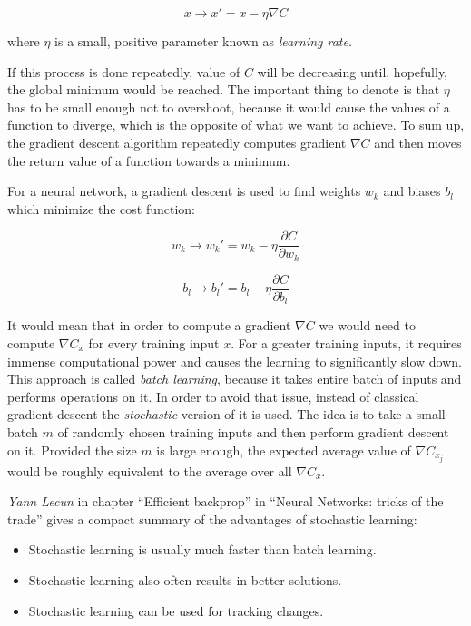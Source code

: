 \begin{equation}
x \longrightarrow x' = x - \eta \nabla C
\end{equation}

where $\eta$ is a small, positive parameter known as \emph{learning rate}.

If this process is done repeatedly, value of $C$ will be decreasing until, hopefully, the global minimum would be reached. The important thing to denote is that $\eta$ has to be small enough not to overshoot, because it would cause the values of a function to diverge, which is the opposite of what we want to achieve. To sum up, the gradient descent algorithm repeatedly computes gradient $\nabla C$ and then moves the return value of a function towards a minimum.

\newpage

For a neural network, a gradient descent is used to find weights $w_k$ and biases $b_l$ which minimize the cost function:

\begin{equation}
    w_k \longrightarrow w_k' = w_k - \eta \frac{\partial C}{\partial w_k}
\end{equation}

\begin{equation}
    b_l \longrightarrow b_l' = b_l - \eta \frac{\partial C}{\partial b_l}
\end{equation}

It would mean that in order to compute a gradient $\nabla C$ we would need to compute $\nabla C_x$ for every training input $x$. For a greater training inputs, it requires immense computational power and causes the learning to significantly slow down. This approach is called \emph{batch learning}, because it takes entire batch of inputs and performs operations on it. In order to avoid that issue, instead of classical gradient descent the \emph{stochastic} version of it is used. The idea is to take a small batch $m$ of randomly chosen training inputs and then perform gradient descent on it. Provided the size $m$ is large enough, the expected average value of $\nabla C_{x_j}$ would be roughly equivalent to the average over all $\nabla C_x$.

\emph{Yann Lecun} in chapter ``Efficient backprop'' in ``Neural Networks: tricks of the trade'' \cite{EfficientBackProp} gives a compact summary of the advantages of stochastic learning:

\begin{itemize}
    \item Stochastic learning is usually much faster than batch learning.
    \item Stochastic learning also often results in better solutions.
    \item Stochastic learning can be used for tracking changes.
\end{itemize}

